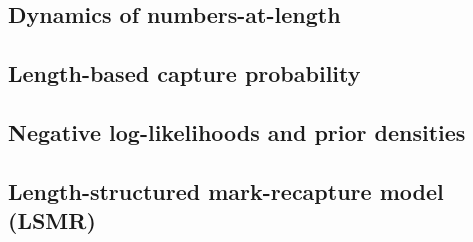 


\subsection{Dynamics of numbers-at-length} %
\label{sub:dynamics_of_numbers_at_length}


\subsection{Length-based capture probability} %
\label{sub:length_based_capture_probability}


\subsection{Negative log-likelihoods and prior densities} %
\label{sub:negative_log_likelihoods_and_prior_densities}


\subsection{Length-structured mark-recapture model (LSMR)}






